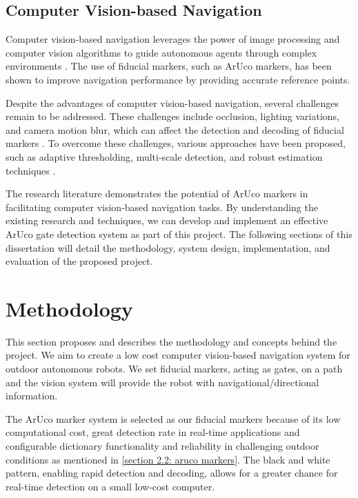 \documentclass[12pt,a4paper]{report}
\def\aruco{ArUco }
\begin{document}
\section{Computer Vision-based Navigation}
Computer vision-based navigation leverages the power of image processing and computer vision algorithms to guide autonomous agents through complex environments \cite{davison2007}. The use of fiducial markers, such as ArUco markers, has been shown to improve navigation performance by providing accurate reference points.

Despite the advantages of computer vision-based navigation, several challenges remain to be addressed. These challenges include occlusion, lighting variations, and camera motion blur, which can affect the detection and decoding of fiducial markers \cite{sattler2011}\cite{maggio_cavallaro_2011}. To overcome these challenges, various approaches have been proposed, such as adaptive thresholding, multi-scale detection, and robust estimation techniques \cite{garrido2016generation}.

The research literature demonstrates the potential of ArUco markers in facilitating computer vision-based navigation tasks. By understanding the existing research and techniques, we can develop and implement an effective ArUco gate detection system as part of this project. The following sections of this dissertation will detail the methodology, system design, implementation, and evaluation of the proposed project.

\chapter{Methodology}
\label{Chapter: Methodology}
This section proposes and describes the methodology and concepts behind the project. We aim to create a low cost computer vision-based navigation system for outdoor autonomous robots.
We set fiducial markers, acting as gates, on a path and the vision system will provide the robot with navigational/directional information.

The \aruco marker system is selected as our fiducial markers because of its low computational cost, great detection rate in real-time applications and configurable dictionary functionality and reliability in challenging outdoor conditions as mentioned in \autoref{section 2.2: aruco markers}. The black and white pattern, enabling rapid detection and decoding, allows for a greater chance for real-time detection on a small low-cost computer.
\end{document}
